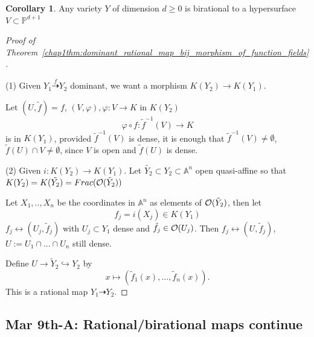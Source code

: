 \documentclass[11pt]{article}
\theoremstyle{definition}
\newtheorem{cor}[thm]{Corollary}
\newcommand{\affn}{\mathbb A}
\newcommand{\proj}{\mathbb P}
\newcommand{\calo}{{\cal O}}
\newcommand{\lrta}{\longrightarrow}
\newcommand{\llrta}{\longleftrightarrow}
\newcommand{\inj}{\hookrightarrow}
\begin{document}
\begin{cor}
Any variety $Y$ of dimension $d\geq 0$ is birational to a hypersurface $V\subset \proj^{d+1}$
\end{cor}
\begin{proof}[Proof of Theorem~\ref{chap1thm:dominant_rational_map_bij_morphism_of_function_fields}]\ 

(1) Given $Y_1\overset{f}{\dashrightarrow}Y_2$ dominant, we want a morphism
$K(Y_2)\lrta K(Y_1)$.

 Let $(U,\tilde{f})=f$, $(V,\varphi),\varphi:V\lrta K$ in $K(Y_2)$
$$
\varphi\circ f: \tilde{f}^{-1}(V)\lrta K
$$ 
 is in $K(Y_1)$, provided $\tilde{f}^{-1}(V)$ is dense, it is enough that $\tilde{f}^{-1}(V)\neq \emptyset$, $\tilde{f}(U)\cap V\neq \emptyset$, since $V$ is open and $\tilde{f}(U)$ is dense.

 (2) Given $i: K(Y_2)\lrta K(Y_1)$. Let $\tilde{Y_2}\subset Y_2\subset \affn^n$ open quasi-affine so that $K(Y_2)=K(\tilde{Y_2})=Frac(\calo(\tilde{Y}_2))$

 Let $X_1,..,X_n$ be the coordinates  in $\affn^n$ as elements of $\calo(\tilde{Y}_2)$, then let
 $$
f_j =i (X_j)\in K(Y_1)
 $$
 $f_j\llrta (U_j,\tilde{f}_j)$ with $U_j\subset Y_1$ dense and $\tilde{f}_j\in\calo(U_j)$. Then 
 $f_j\llrta (U,\tilde{f}_j)$, $U:=U_1\cap ...\cap U_n$ still dense.

 Define $U\lrta \tilde{Y}_2\inj Y_2$ by
 $$
x\longmapsto (\tilde{f}_1(x),...,\tilde{f}_n(x)).
 $$
This is a rational map $Y_1\dashrightarrow Y_2$.
\end{proof}

\subsection{Mar 9th-A: Rational/birational maps continue}
\end{document}
